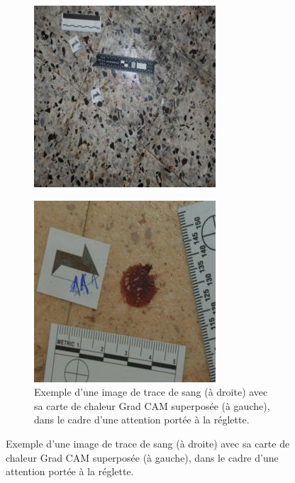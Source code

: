 \begin{figure}
\begin{subfigure}{0.40\linewidth}
        \includegraphics[width=\linewidth]{../asset/exemple/attention_reglette_image.jpg}
    \end{subfigure}
    \begin{figure}
        \centering
        \includegraphics[width=\textwidth]{../asset/exemple/14.jpg}
        \caption{Exemple d'une image  de trace de sang (à droite) avec sa carte de chaleur Grad CAM superposée (à gauche), dans le cadre d'une attention portée à la réglette.}
        \label{fig:grad_cam_example}
    \end{figure}
    \label{fig:grad_cam_example}
\end{figure}




